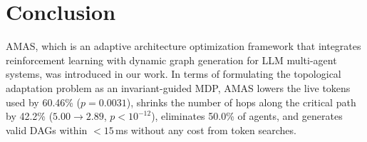 ﻿\documentclass[conference]{IEEEtran}
\begin{document}
\section{Conclusion}
\label{sec:conclusion}
AMAS, which is an adaptive architecture optimization framework that integrates reinforcement learning with dynamic graph generation for LLM multi-agent systems, was introduced in our work. In terms of formulating the topological adaptation problem as an invariant-guided MDP, AMAS lowers the live tokens used by 60.46\% ($p = 0.0031$), shrinks the number of hops along the critical path by 42.2\% ($5.00 \to 2.89$, $p < 10^{-12}$), eliminates 50.0\% of agents, and generates valid DAGs within $<15$\,ms without any cost from token searches.



\end{document}

